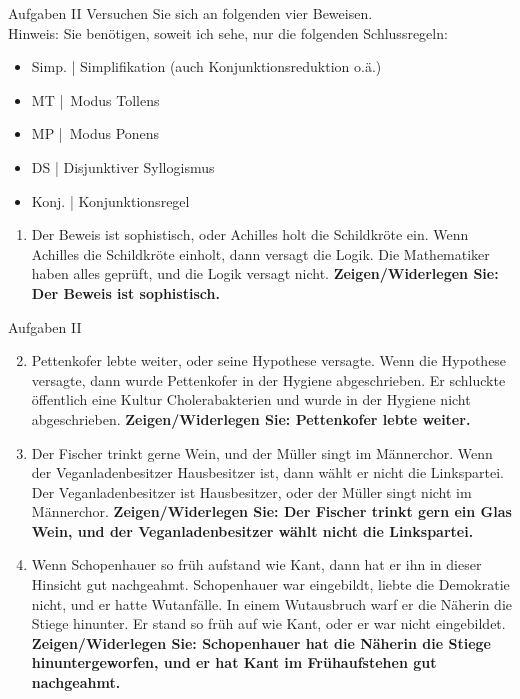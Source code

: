 \begin{frame}
  {Aufgaben II}
  Versuchen Sie sich an folgenden vier Beweisen.\\
  \Halbzeile
  Hinweis: Sie benötigen, soweit ich sehe, nur die folgenden Schlussregeln:
  \Viertelzeile
  \begin{itemize}\footnotesize
    \item Simp. | Simplifikation (auch Konjunktionsreduktion o.\"a.)
    \item MT | Modus Tollens
    \item MP | Modus Ponens
    \item DS | Disjunktiver Syllogismus
    \item Konj. | Konjunktionsregel
  \end{itemize}
  \Halbzeile
  \begin{enumerate}\footnotesize
    \item Der Beweis ist sophistisch, oder Achilles holt die Schildkr\"ote ein. Wenn Achilles die Schildkr\"ote einholt, dann versagt die Logik. Die Mathematiker haben alles gepr\"uft, und die Logik versagt nicht. \textbf{Zeigen/Widerlegen Sie: Der Beweis ist sophistisch.}
  \end{enumerate}
\end{frame}

\begin{frame}
  {Aufgaben II}
  \begin{enumerate}\setcounter{enumi}{1}\footnotesize
    \item Pettenkofer lebte weiter, oder seine Hypothese versagte. Wenn die Hypothese versagte, dann wurde Pettenkofer in der Hygiene abgeschrieben. Er schluckte \"offentlich eine Kultur Cholerabakterien und wurde in der Hygiene nicht abgeschrieben. \textbf{Zeigen/Widerlegen Sie: Pettenkofer lebte weiter.}
    \item Der Fischer trinkt gerne Wein, und der M\"uller singt im M\"annerchor. Wenn der Veganladenbesitzer Hausbesitzer ist, dann w\"ahlt er nicht die Linkspartei. Der Veganladenbesitzer ist Hausbesitzer, oder der M\"uller singt nicht im M\"annerchor. \textbf{Zeigen/Widerlegen Sie: Der Fischer trinkt gern ein Glas Wein, und der Veganladenbesitzer w\"ahlt nicht die Linkspartei.}
    \item Wenn Schopenhauer so fr\"uh aufstand wie Kant, dann hat er ihn in dieser Hinsicht gut nachgeahmt. Schopenhauer war eingebildt, liebte die Demokratie nicht, und er hatte Wutanf\"alle. In einem Wutausbruch warf er die N\"aherin die Stiege hinunter. Er stand so fr\"uh auf wie Kant, oder er war nicht eingebildet. \textbf{Zeigen/Widerlegen Sie: Schopenhauer hat die N\"aherin die Stiege hinuntergeworfen, und er hat Kant im Fr\"uhaufstehen gut nachgeahmt.}
  \end{enumerate}
\end{frame}


